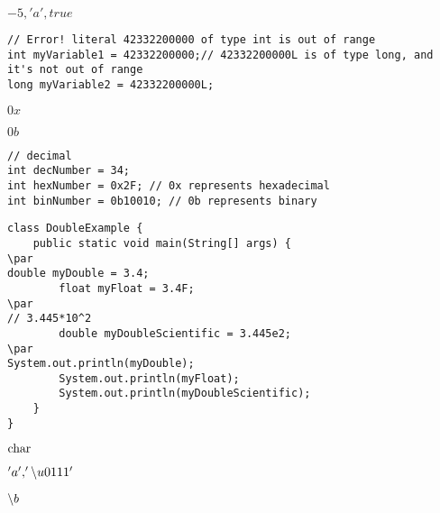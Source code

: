 \documentclass{book}
\def\lthtmlcheckvsize{\ifdim\ht\sizebox<\vsize 
  \ifdim\wd\sizebox<\hsize\expandafter\hfill\fi \expandafter\vfill
  \else\expandafter\vss\fi}%
\begin{document}
{\newpage\clearpage
{}%
$-5, 'a', true$%
\lthtmlindisplaymathZ
\lthtmlcheckvsize\clearpage}

{\newpage\clearpage
{}%
\begin{lstlisting}
// Error! literal 42332200000 of type int is out of range
int myVariable1 = 42332200000;// 42332200000L is of type long, and it's not out of range
long myVariable2 = 42332200000L;
\end{lstlisting}%
\lthtmlfigureZ
\lthtmlcheckvsize\clearpage}

{\newpage\clearpage
{}%
$0x$%
\lthtmlindisplaymathZ
\lthtmlcheckvsize\clearpage}

{\newpage\clearpage
{}%
$0b$%
\lthtmlindisplaymathZ
\lthtmlcheckvsize\clearpage}

{\newpage\clearpage
{}%
\begin{lstlisting}
// decimal
int decNumber = 34;
int hexNumber = 0x2F; // 0x represents hexadecimal
int binNumber = 0b10010; // 0b represents binary
\end{lstlisting}%
\lthtmlfigureZ
\lthtmlcheckvsize\clearpage}

{\newpage\clearpage
{}%
\begin{lstlisting}
class DoubleExample {
    public static void main(String[] args) {
\par
double myDouble = 3.4;
        float myFloat = 3.4F;
\par
// 3.445*10^2
        double myDoubleScientific = 3.445e2;
\par
System.out.println(myDouble);
        System.out.println(myFloat);
        System.out.println(myDoubleScientific);
    }
}
\end{lstlisting}%
\lthtmlfigureZ
\lthtmlcheckvsize\clearpage}

{\newpage\clearpage
{}%
$\lstinline{char}$%
\lthtmlindisplaymathZ
\lthtmlcheckvsize\clearpage}

{\newpage\clearpage
{}%
$'a', '\symbol{92}u0111'$%
\lthtmlindisplaymathZ
\lthtmlcheckvsize\clearpage}

{\newpage\clearpage
{}%
$\symbol{92}b$%
\lthtmlindisplaymathZ
\lthtmlcheckvsize\clearpage}
\end{document}
